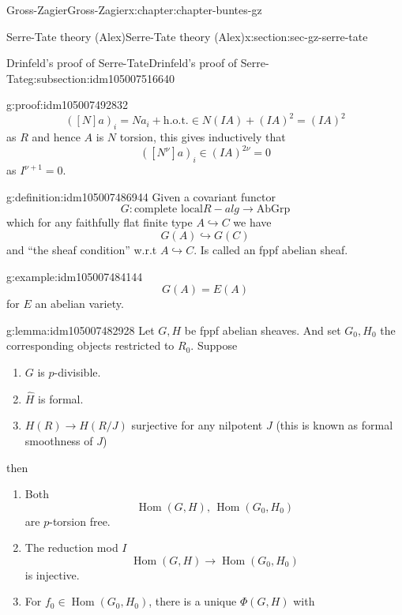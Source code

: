 \documentclass[oneside,10pt,]{book}
\numberwithin{equation}{section}
\newcommand{\lb}{[}
\newcommand{\rb}{]}
\DeclareMathOperator{\Hom}{Hom}
\begin{document}
\begin{chapterptx}{Gross-Zagier}{}{Gross-Zagier}{}{}{x:chapter:chapter-buntes-gz}
\begin{sectionptx}{Serre-Tate theory (Alex)}{}{Serre-Tate theory (Alex)}{}{}{x:section:sec-gz-serre-tate}
\begin{subsectionptx}{Drinfeld's proof of Serre-Tate}{}{Drinfeld's proof of Serre-Tate}{}{}{g:subsection:idm105007516640}
\begin{proofptx}{}{g:proof:idm105007492832}
\begin{equation*}
(\lb N\rb a)_i = N a_i + \text{h.o.t.} \in N(IA) + (IA)^2 = (IA)^2
\end{equation*}
as \(R\) and hence \(A\) is \(N\) torsion, this gives inductively that%
\begin{equation*}
([N^\nu] a)_i \in (IA)^{2\nu}  =0
\end{equation*}
as \(I^{\nu + 1}   =0 \).%
\end{proofptx}
\begin{definition}{}{g:definition:idm105007486944}%
Given a covariant functor%
\begin{equation*}
G \colon \text{complete local} R-alg \to \text{AbGrp}
\end{equation*}
which for any faithfully flat finite type \(A \hookrightarrow C\) we have%
\begin{equation*}
G(A)\hookrightarrow G(C)
\end{equation*}
and ``the sheaf condition'' w.r.t \(A\hookrightarrow C\). Is called an fppf abelian sheaf.%
\end{definition}
\begin{example}{}{g:example:idm105007484144}%
%
\begin{equation*}
G(A) = E(A)
\end{equation*}
for \(E\) an abelian variety.%
\end{example}
\begin{lemma}{}{}{g:lemma:idm105007482928}%
Let \(G,H\) be fppf abelian sheaves. And set \(G_0, H_0\) the corresponding objects restricted to \(R_0\). Suppose%
\begin{enumerate}
\item{}\(G\) is \(p\)-divisible.%
\item{}\(\hat H\) is formal.%
\item{}\(H (R) \to H(R/J)\) surjective for any nilpotent \(J\) (this is known as formal smoothness of \(J\))%
\end{enumerate}
then%
\begin{enumerate}
\item{}Both%
\begin{equation*}
\Hom (G,H),\,\Hom(G_0,H_0)
\end{equation*}
are \(p\)-torsion free.%
\item{}The reduction mod \(I\)%
\begin{equation*}
\Hom(G, H) \to  \Hom(G_0, H_0)
\end{equation*}
is injective.%
\item{}For \(f_0 \in \Hom(G_0,H_0)\), there is a unique \(\Phi (G, H)\) with%

\end{enumerate}
\end{lemma}
\end{subsectionptx}
\end{sectionptx}
\end{chapterptx}
\end{document}
